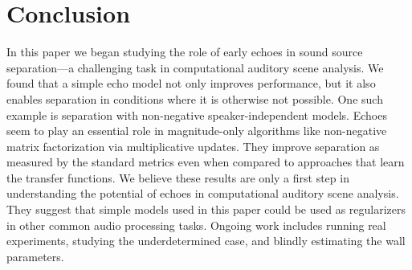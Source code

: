 
\section{Conclusion}

In this paper we began studying the role of early echoes in sound source separation---a challenging task in computational auditory scene analysis.
We found that a simple echo model not only improves performance, but it also enables separation in conditions where it is otherwise not possible.
One such example is separation with non-negative speaker-independent models.
Echoes seem to play an essential role in magnitude-only algorithms like non-negative matrix factorization via multiplicative updates.
They improve separation as measured by the standard metrics even when compared to approaches that learn the transfer functions.
We believe these results are only a first step in understanding the potential of echoes in computational auditory scene analysis.
They suggest that simple models used in this paper could be used as regularizers in other common audio processing tasks.
Ongoing work includes running real experiments, studying the underdetermined case, and blindly estimating the wall parameters.

